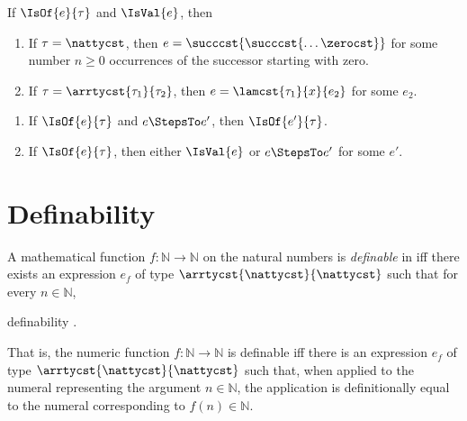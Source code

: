 \begin{comment}
If, instead, we prefer to insist that the recursive call always be evaluated we
may replace rule~\infruleref{goedelt}{dynamic}{rec-succ} with the following
variant:
\begin{infrule*}{rec-succ}
  \infer[.]
  {
    \begin{gathered}
    \natrecabt{\tau}{\succabt{e}}{e_0}{x}{y}{e_1} \\[-1ex]
    \StepsTo  \\[-1ex]
    \appabt{\appabt{\lamabt{\nattyabt}{x}{\lamabt{\tau}{y}{e_1}}}{e}}{\natrecabt{\tau}{e}{e_0}{x}{y}{e_1}}
    \end{gathered}
  }
  {\IsVal{\succabt{e}}}
\end{infrule*}
Rule~\infrulerefstar{goedelt}{rec-succ} forces evaluation of the recursive call prior to evaluation of $e_1$.
\end{comment}

\begin{lemma}
   If $\IsOf{e}{\tau}$ and $\IsVal{e}$, then
  \begin{enumerate}
  \item If $\tau=\nattycst$, then $e=\succcst{\succcst{\dots\zerocst}}$ for some
    number $n\geq 0$ occurrences of the successor starting with zero.
  \item If $\tau=\arrtycst{\tau_1}{\tau_2}$, then $e=\lamcst{\tau_1}{x}{e_2}$
    for some $e_2$.
  \end{enumerate}
\end{lemma}


\begin{theorem}[Safety]
  \begin{enumerate}
  \item If $\IsOf{e}{\tau}$ and $e\StepsTo e'$, then $\IsOf{e'}{\tau}$.
  \item If $\IsOf{e}{\tau}$, then either $\IsVal{e}$ or $e\StepsTo e'$ for some
    $e'$.
  \end{enumerate}
\end{theorem}

\section{Definability}

A mathematical function $f:\mathbb{N}\to\mathbb{N}$ on the natural numbers is
\emph{definable} in \LangT{} iff there exists an expression $e_f$ of type
$\arrtycst{\nattycst}{\nattycst}$ such that for every $n\in\mathbb{N}$,
\begin{displayed}{definability}
  .
\end{displayed}
That is, the numeric function $f:\mathbb{N}\to\mathbb{N}$ is definable iff there
is an expression $e_f$ of type $\arrtycst{\nattycst}{\nattycst}$ such that, when
applied to the numeral representing the argument $n\in\mathbb{N}$, the
application is definitionally equal to the numeral corresponding to
$f(n)\in\mathbb{N}$.

